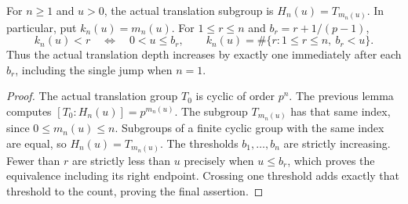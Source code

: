 \begin{lemma}
\label{ft:kummer-upper-jumps}
\leanok
For $n\geq1$ and $u>0$, the actual translation subgroup is
$H_n(u)=T_{m_n(u)}$. In particular, put $k_n(u)=m_n(u)$.
For $1\leq r\leq n$ and $b_r=r+1/(p-1)$,
\[
 k_n(u)<r\quad\Longleftrightarrow\quad 0<u\leq b_r,\qquad
 k_n(u)=\#\{r:1\leq r\leq n,\ b_r<u\}.
\]
Thus the actual translation depth increases by exactly one immediately
after each $b_r$, including the single jump when $n=1$.
\end{lemma}
\begin{proof}
The actual translation group $T_0$ is cyclic of order $p^n$.
The previous lemma computes $[T_0:H_n(u)]=p^{m_n(u)}$.
The subgroup $T_{m_n(u)}$ has that same index, since
$0\leq m_n(u)\leq n$. Subgroups of a finite cyclic group with the same
index are equal, so $H_n(u)=T_{m_n(u)}$.
The thresholds $b_1,\ldots,b_n$ are strictly increasing.
Fewer than $r$ are strictly less than $u$ precisely when $u\leq b_r$,
which proves the equivalence including its right endpoint.
Crossing one threshold adds exactly that threshold to the count,
proving the final assertion.
\end{proof}

